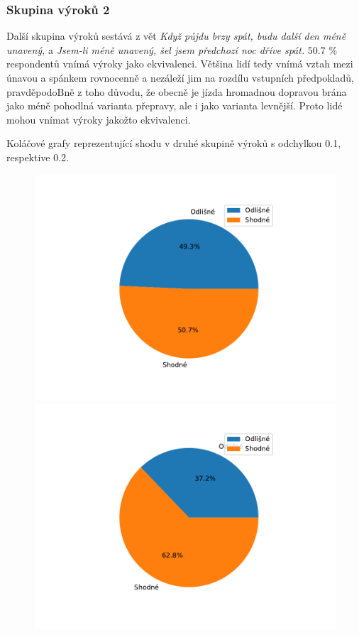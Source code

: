 \subsubsection{Skupina výrok\r u 2}
Další skupina výrok\r u sestává z vět \textit{\clqq Když půjdu brzy spát, budu další den méně unavený,\crqq } \space a \textit{\clqq Jsem-li méně unavený, šel jsem předchozí noc dříve spát.\crqq } \space  $50.7$ \space $\%$ respondent\r u vnímá výroky jako ekvivalenci. Většina lidí tedy vnímá vztah mezi \' unavou a spánkem rovnocenně a nezáleží jim na rozdílu vstupních předpoklad\r u, pravděpodoBně z toho d\r uvodu, že obecně je jízda hromadnou dopravou brána jako méně pohodlná varianta přepravy, ale i jako varianta levnější. Proto lidé mohou vnímat výroky jakožto ekvivalenci.
\begin{graph}
Koláčové grafy reprezentující shodu v druhé skupině výrok\r u s odchylkou 0.1, respektive 0.2.
    \begin{figure}[H]
                \includegraphics[scale=0.5]{template-fig/group1.pdf}
                \includegraphics[scale=0.5]{template-fig/group11.pdf}
            \end{figure}
\end{graph}
